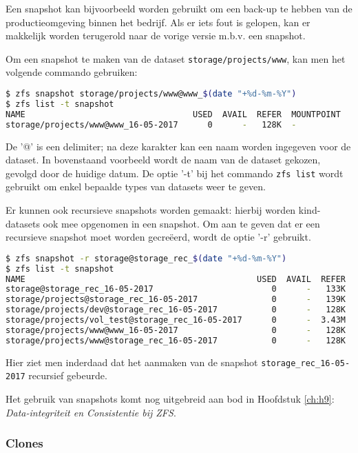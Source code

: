 Een snapshot kan bijvoorbeeld worden gebruikt om een back-up te hebben van de productieomgeving binnen het bedrijf. Als er iets fout is gelopen, kan er makkelijk worden terugerold naar de vorige versie m.b.v. een snapshot. 

Om een snapshot te maken van de dataset \texttt{storage/projects/www}, kan men het volgende commando gebruiken:

\begin{lstlisting}[language=bash,style=command_style] 
$ zfs snapshot storage/projects/www@www_$(date "+%d-%m-%Y")
$ zfs list -t snapshot
NAME                                  USED  AVAIL  REFER  MOUNTPOINT
storage/projects/www@www_16-05-2017      0      -   128K  -
\end{lstlisting}

De '@' is een delimiter; na deze karakter kan een naam worden ingegeven voor de dataset. In bovenstaand voorbeeld wordt de naam van de dataset gekozen, gevolgd door de huidige datum. De optie '-t' bij het commando \texttt{zfs list} wordt gebruikt om enkel bepaalde types van datasets weer te geven.

Er kunnen ook recursieve snapshots worden gemaakt: hierbij worden kind-datasets ook mee opgenomen in een snapshot. Om aan te geven dat er een recursieve snapshot moet worden gecreëerd, wordt de optie '-r' gebruikt.

\begin{lstlisting}[language=bash,style=command_style] 
$ zfs snapshot -r storage@storage_rec_$(date "+%d-%m-%Y")
$ zfs list -t snapshot
NAME                                               USED  AVAIL  REFER  MOUNTPOINT
storage@storage_rec_16-05-2017                        0      -   133K  -
storage/projects@storage_rec_16-05-2017               0      -   139K  -
storage/projects/dev@storage_rec_16-05-2017           0      -   128K  -
storage/projects/vol_test@storage_rec_16-05-2017      0      -  3.43M  -
storage/projects/www@www_16-05-2017                   0      -   128K  -
storage/projects/www@storage_rec_16-05-2017           0      -   128K  -
\end{lstlisting}

Hier ziet men inderdaad dat het aanmaken van de snapshot \texttt{storage\_rec\_16-05-2017} recursief gebeurde.

Het gebruik van snapshots komt nog uitgebreid aan bod in Hoofdstuk \ref{ch:h9}: \textit{Data-integriteit en Consistentie bij ZFS}.

\subsubsection{Clones}

